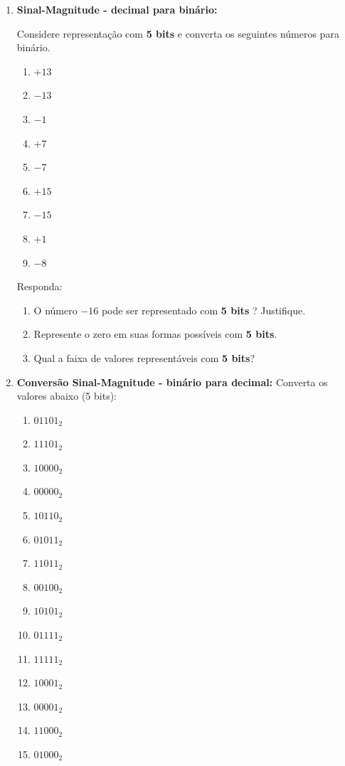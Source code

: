 \begin{enumerate}
    \item \textbf{Sinal-Magnitude  - decimal para binário:}

          Considere representação com \textbf{5 bits} e converta os seguintes números para binário.

          \begin{enumerate}
              \item $+13$
              \item  $-13$
              \item  $-1$
              \item  $+7$
              \item  $-7$
              \item  $+15$
              \item  $-15$
              \item  $+1$
              \item  $-8$
          \end{enumerate}

          Responda:
          \begin{enumerate}
              \item O número $-16$ pode ser representado com \textbf{5 bits} ?  Justifique.
              \item Represente o zero em suas formas possíveis com \textbf{5 bits}.
              \item Qual a faixa de valores representáveis com \textbf{5 bits}?
          \end{enumerate}

    \item \textbf{Conversão Sinal-Magnitude - binário para decimal:}
          Converta os valores abaixo (5 bits):

          \begin{enumerate}
              \item $01101_2$
              \item $11101_2$
              \item $10000_2$
              \item $00000_2$
              \item $10110_2$
              \item $01011_2$
              \item $11011_2$
              \item $00100_2$
              \item $10101_2$
              \item $01111_2$
              \item $11111_2$
              \item $10001_2$
              \item $00001_2$
              \item $11000_2$
              \item $01000_2$
          \end{enumerate}


\end{enumerate}
